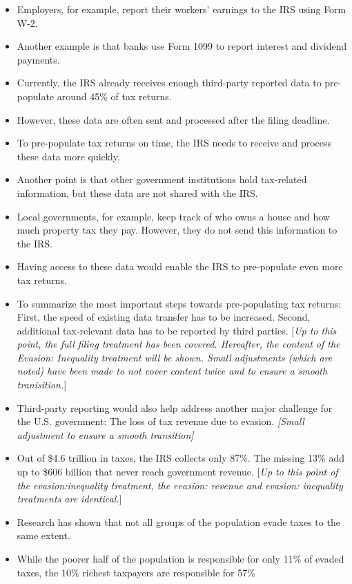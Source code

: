 \documentclass[11pt]{article}
\begin{document}
\begin{itemize}
    \item Employers, for example, report their workers’ earnings to the IRS using Form W-2.  
    \item Another example is that banks use Form 1099 to report interest and dividend payments. 
    \item Currently, the IRS already receives enough third-party reported data to pre-populate around 45\% of tax returns. 
    \item However, these data are often sent and processed after the filing deadline.
    \item To pre-populate tax returns on time, the IRS needs to receive and process these data more quickly. 
    \item Another point is that other government institutions hold tax-related information, but these data are not shared with the IRS. 
    \item Local governments, for example, keep track of who owns a house and how much property tax they pay. However, they do not send this information to the IRS. 
    \item Having access to these data would enable the IRS to pre-populate even more tax returns. 
    \item To summarize the most important steps towards pre-populating tax returns: 
    First, the speed of existing data transfer has to be increased. Second, additional tax-relevant data has to be reported by third parties. [\textit{Up to this point, the full filing treatment has been covered. Hereafter, the content of the Evasion: Inequality treatment will be shown. Small adjustments (which are noted) have been made to not cover content twice and to ensure a smooth tranisition.}]
    \item Third-party reporting would also help address another major challenge for the U.S. government: The loss of tax revenue due to evasion.  \textit{[Small adjustment to ensure a smooth transition]}
    \item Out of \$4.6 trillion in taxes, the IRS collects only 87\%. The missing 13\% add up to \$606 billion that never reach government revenue. [\textit{Up to this point of the evasion:inequality treatment, the evasion: revenue and evasion: inequality treatments are identical.}]
    \item Research has shown that not all groups of the population evade taxes to the same extent. 
    \item While the poorer half of the population is responsible for only 11\% of evaded taxes, the 10\% richest taxpayers are responsible for 57\% 

\end{itemize}
\end{document}
